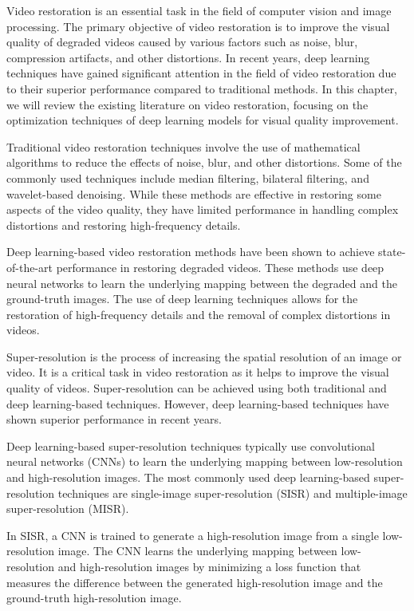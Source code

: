 \label{chap:Background}

Video restoration is an essential task in the field of computer vision and image processing. The primary objective of video restoration is to improve the visual quality of degraded videos caused by various factors such as noise, blur, compression artifacts, and other distortions. In recent years, deep learning techniques have gained significant attention in the field of video restoration due to their superior performance compared to traditional methods. In this chapter, we will review the existing literature on video restoration, focusing on the optimization techniques of deep learning models for visual quality improvement.

Traditional video restoration techniques involve the use of mathematical algorithms to reduce the effects of noise, blur, and other distortions. Some of the commonly used techniques include median filtering, bilateral filtering, and wavelet-based denoising. While these methods are effective in restoring some aspects of the video quality, they have limited performance in handling complex distortions and restoring high-frequency details.

Deep learning-based video restoration methods have been shown to achieve state-of-the-art performance in restoring degraded videos. These methods use deep neural networks to learn the underlying mapping between the degraded and the ground-truth images. The use of deep learning techniques allows for the restoration of high-frequency details and the removal of complex distortions in videos.

Super-resolution is the process of increasing the spatial resolution of an image or video. It is a critical task in video restoration as it helps to improve the visual quality of videos. Super-resolution can be achieved using both traditional and deep learning-based techniques. However, deep learning-based techniques have shown superior performance in recent years.

Deep learning-based super-resolution techniques typically use convolutional neural networks (CNNs) to learn the underlying mapping between low-resolution and high-resolution images. The most commonly used deep learning-based super-resolution techniques are single-image super-resolution (SISR) and multiple-image super-resolution (MISR).

In SISR, a CNN is trained to generate a high-resolution image from a single low-resolution image. The CNN learns the underlying mapping between low-resolution and high-resolution images by minimizing a loss function that measures the difference between the generated high-resolution image and the ground-truth high-resolution image.

